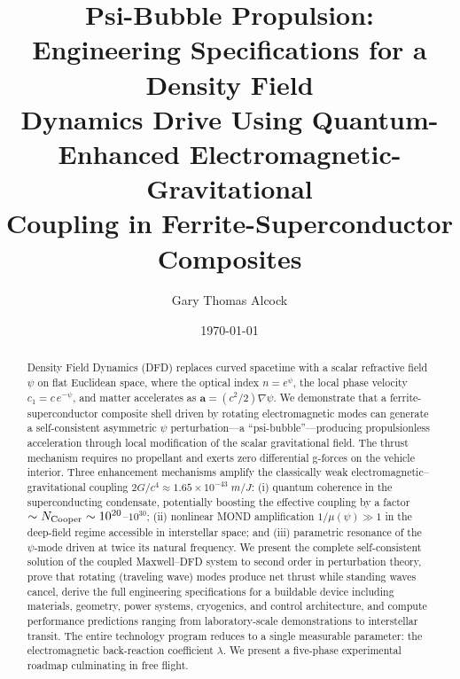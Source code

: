 \documentclass[twocolumn,prl,superscriptaddress,nofootinbib,longbibliography,floatfix]{revtex4-2}
\newcommand{\avec}{\mathbf{a}}
\begin{document}
\title{Psi-Bubble Propulsion: Engineering Specifications for a Density Field\\
Dynamics Drive Using Quantum-Enhanced Electromagnetic-Gravitational\\
Coupling in Ferrite-Superconductor Composites}

\author{Gary Thomas Alcock}

\date{\today}

\begin{abstract}
Density Field Dynamics (DFD) replaces curved spacetime with a scalar
refractive field $\psi$ on flat Euclidean space, where the optical index
$n = e^\psi$, the local phase velocity $c_1 = c\,e^{-\psi}$, and matter
accelerates as $\avec = (c^2/2)\nabla\psi$.  We demonstrate that a
ferrite-superconductor composite shell driven by rotating electromagnetic
modes can generate a self-consistent asymmetric $\psi$ perturbation---a
``psi-bubble''---producing propulsionless acceleration through local
modification of the scalar gravitational field.  The thrust mechanism
requires no propellant and exerts zero differential g-forces on the
vehicle interior.  Three enhancement mechanisms amplify the classically
weak electromagnetic--gravitational coupling $2G/c^4 \approx
1.65 \times 10^{-43}\;\si{m/J}$: (i) quantum coherence in the
superconducting condensate, potentially boosting the effective coupling
by a factor $\sim N_{\rm Cooper} \sim 10^{20}$--$10^{30}$; (ii)
nonlinear MOND amplification $1/\mu(\psi) \gg 1$ in the deep-field
regime accessible in interstellar space; and (iii) parametric resonance
of the $\psi$-mode driven at twice its natural frequency.  We present
the complete self-consistent solution of the coupled Maxwell--DFD system
to second order in perturbation theory, prove that rotating (traveling
wave) modes produce net thrust while standing waves cancel, derive the
full engineering specifications for a buildable device including
materials, geometry, power systems, cryogenics, and control architecture,
and compute performance predictions ranging from laboratory-scale
demonstrations to interstellar transit.  The entire technology program
reduces to a single measurable parameter: the electromagnetic
back-reaction coefficient $\lambda$.  We present a five-phase
experimental roadmap culminating in free flight.
\end{abstract}

\maketitle
\end{document}
